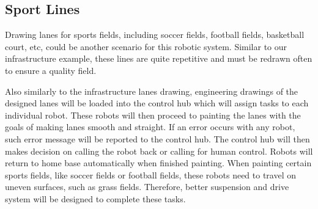 \subsection{Sport Lines}
Drawing lanes for sports fields, including soccer fields, football fields, basketball court, etc, could be another scenario for this robotic system. Similar to our infrastructure example, these lines are quite repetitive and must be redrawn often to ensure a quality field. 

Also similarly to the infrastructure lanes drawing, engineering drawings of the designed lanes will be loaded into the control hub which will assign tasks to each individual robot. These robots will then proceed to painting the lanes with the goals of making lanes smooth and straight. If an error occurs with any robot, such error message will be reported to the control hub. The control hub will then makes decision on calling the robot back or calling for human control. Robots will return to home base automatically when finished painting. When painting certain sports fields, like soccer fields or football fields, these robots need to travel on uneven surfaces, such as grass fields. Therefore, better suspension and drive system will be designed to complete these tasks.
